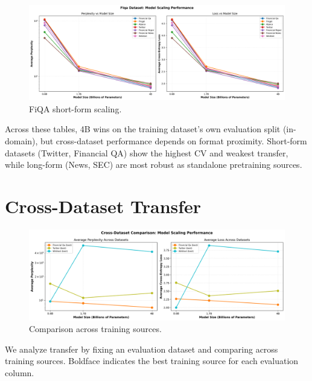 

\begin{figure}[H]
  \centering
  \includegraphics[width=\textwidth]{../thesis/figures/scaling_fiqa.png}
  \caption{FiQA short-form scaling.}\label{fig:scaling_fiqa}
\end{figure}







Across these tables, 4B wins on the training dataset's own evaluation split (in-domain), but cross-dataset performance depends on format proximity. Short-form datasets (Twitter, Financial QA) show the highest CV and weakest transfer, while long-form (News, SEC) are most robust as standalone pretraining sources.

\section{Cross-Dataset Transfer}
\begin{figure}[H]
  \centering
  \includegraphics[width=\textwidth]{../thesis/figures/scaling_comparison_all.png}
  \caption{Comparison across training sources.}\label{fig:scaling_comparison_all}
\end{figure}

We analyze transfer by fixing an evaluation dataset and comparing across training sources. Boldface indicates the best training source for each evaluation column.

